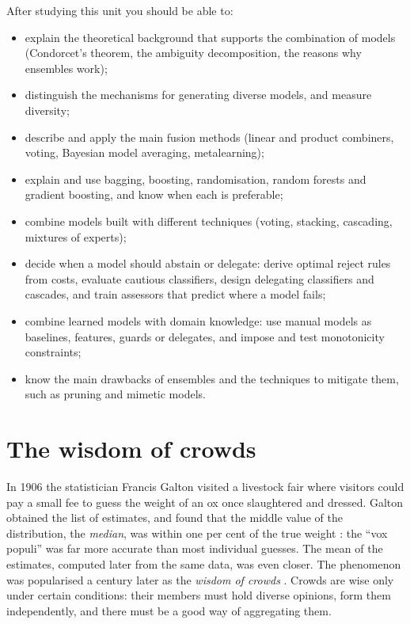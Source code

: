 \begin{objectives}
After studying this unit you should be able to:
\begin{itemize}
  \item explain the theoretical background that supports the combination of models
        (Condorcet's theorem, the ambiguity decomposition, the reasons why ensembles work);
  \item distinguish the mechanisms for generating diverse models, and measure diversity;
  \item describe and apply the main fusion methods (linear and product combiners, voting,
        Bayesian model averaging, metalearning);
  \item explain and use bagging, boosting, randomisation, random forests and gradient
        boosting, and know when each is preferable;
  \item combine models built with different techniques (voting, stacking, cascading,
        mixtures of experts);
  \item decide when a model should abstain or delegate: derive optimal reject rules from costs,
        evaluate cautious classifiers, design delegating classifiers and cascades, and
train assessors that predict where a model fails;
\item combine learned models with domain knowledge: use manual models as baselines, features, guards or
delegates, and impose and test monotonicity constraints;
  \item know the main drawbacks of ensembles and the techniques to mitigate them, such as
        pruning and mimetic models.
\end{itemize}
\end{objectives}

\section{The wisdom of crowds}\label{sec:crowds}

In 1906 the statistician Francis Galton visited a livestock fair where visitors could pay a
small fee to guess the weight of an ox once slaughtered and dressed. Galton obtained the list
of estimates, and found that the middle value of the distribution, the \emph{median}, was
within one per cent of the true weight \citep{galton1907vox}: the ``vox populi'' was far
more accurate than most individual guesses. The
mean of the estimates, computed later from the same data, was even closer. The phenomenon was
popularised a century later as the \emph{wisdom of crowds} \citep{surowiecki2004wisdom}.
Crowds are wise only under certain conditions: their members must hold diverse opinions,
form them independently, and there must be a good way of aggregating them.

